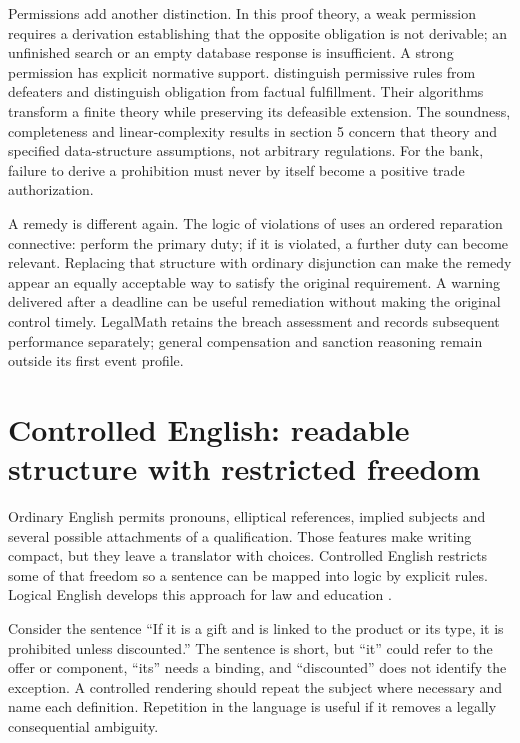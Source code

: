 \documentclass[12pt,a4paper,oneside,openany]{book}
\begin{document}
Permissions add another distinction. In this proof theory, a weak permission
requires a derivation establishing that the opposite obligation is not
derivable; an unfinished search or an empty database response is insufficient.
A strong permission has explicit normative support. \citet[secs.~2--3, 6]{permissions2012} distinguish permissive
rules from defeaters and distinguish obligation from factual fulfillment.
Their algorithms transform a finite theory while preserving its defeasible
extension. The soundness, completeness and linear-complexity results in section 5
concern that theory and specified data-structure assumptions, not arbitrary
regulations. For the bank, failure to derive a prohibition must never by itself
become a positive trade authorization.

A remedy is different again. The logic of violations of
\citet[secs.~2--5]{violations2006} uses an ordered reparation connective: perform
the primary duty; if it is violated, a further duty can become relevant.
Replacing that structure with ordinary disjunction can make the remedy appear
an equally acceptable way to satisfy the original requirement. A warning delivered
after a deadline can be useful remediation without making the original control
timely. LegalMath retains the breach assessment and records subsequent performance
separately; general compensation and sanction reasoning remain outside its first
event profile.

\section{Controlled English: readable structure with restricted freedom}
\label{merge:M04:02}

\label{sec:languages-logicalenglish}
Ordinary English permits pronouns, elliptical references, implied subjects and
several possible attachments of a qualification. Those features make writing
compact, but they leave a translator with choices. Controlled English restricts
some of that freedom so a sentence can be mapped into logic by explicit rules.
Logical English develops this approach for law and education
\citep[language specification and examples]{logicalenglish2023}.

Consider the sentence ``If it is a gift and is linked to the product or its
type, it is prohibited unless discounted.'' The sentence is short, but ``it''
could refer to the offer or component, ``its'' needs a binding, and ``discounted''
does not identify the exception. A controlled rendering should repeat the
subject where necessary and name each definition. Repetition in the language
is useful if it removes a legally consequential ambiguity.
\end{document}
